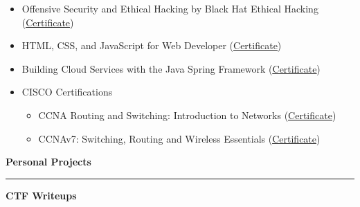 \documentclass[12pt]{article}
\begin{document}
{\renewcommand{\labelitemi}{\textcolor{bgcolor}{\normalsize$\bullet$}}%
   \begin{itemize}[leftmargin=13pt, itemsep=0pt, topsep=0pt]
      \item Offensive Security and Ethical Hacking by Black Hat Ethical Hacking (\href{https://giorgospaphitis.com/resources/pdfs/Offensive_Security_Ethical_Hacking_Course_Certificate_Giorgos_Paphitis.pdf}{\underline{Certificate}})\\
      \item HTML, CSS, and JavaScript for Web Developer (\href{https://www.coursera.org/account/accomplishments/verify/F7P88FB4ZCZ9?utm_source=ln&utm_medium=certificate&utm_content=cert_image&utm_campaign=sharing_cta&utm_product=course}{\underline{Certificate}})\\
      \item Building Cloud Services with the Java Spring Framework (\href{https://www.coursera.org/account/accomplishments/verify/QMED2F9XQBMH?utm_source=link&utm_medium=certificate&utm_content=cert_image&utm_campaign=sharing_cta&utm_product=course}{\underline{Certificate}})\\
      \item CISCO Certifications\\
      \begin{itemize}[leftmargin=20pt, itemsep=0pt, topsep=-3pt,partopsep=0pt]
         \item CCNA Routing and Switching: Introduction to Networks (\href{https://giorgospaphitis.com/resources/pdfs/Giorgos_Paphitis_CCNA_Intro.pdf}{\underline{Certificate}})\\
         \item CCNAv7: Switching, Routing and Wireless Essentials (\href{https://giorgospaphitis.com/resources/pdfs/Giorgos_Paphitis_CCNA_7.pdf}{\underline{Certificate}})\\
      \end{itemize}
   \end{itemize}
}
\vspace{1cm}
{\fontsize{14pt}{13pt}\selectfont
   \textbf{\textcolor{bgcolor}{Personal Projects}}\\[0.3em]
}
\hrule
\vspace{0.5cm}
\textbf{\textcolor{bgcolor}{CTF Writeups}}\\[0.5em]
\end{document}
